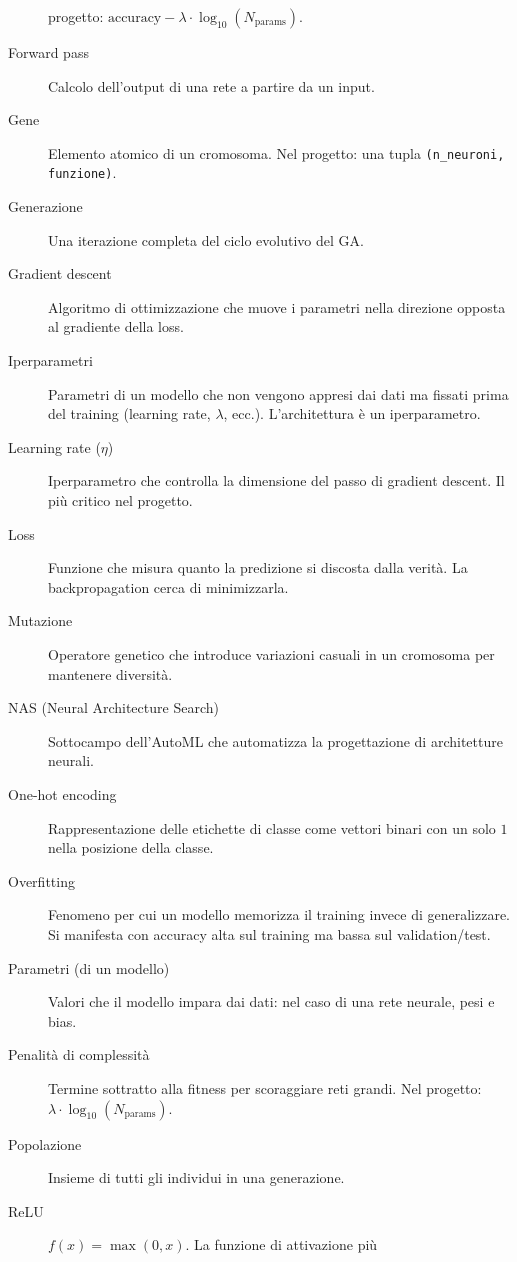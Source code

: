\documentclass[11pt,a4paper]{article}
\begin{document}
\begin{description}
        progetto: $\text{accuracy} - \lambda \cdot \log_{10}(N_{\text{params}})$.
    \item[Forward pass] Calcolo dell'output di una rete a partire da un
        input.
    \item[Gene] Elemento atomico di un cromosoma. Nel progetto: una
        tupla \texttt{(n\_neuroni, funzione)}.
    \item[Generazione] Una iterazione completa del ciclo evolutivo del GA.
    \item[Gradient descent] Algoritmo di ottimizzazione che muove i
        parametri nella direzione opposta al gradiente della loss.
    \item[Iperparametri] Parametri di un modello che non vengono appresi
        dai dati ma fissati prima del training (learning rate, $\lambda$,
        ecc.). L'architettura è un iperparametro.
    \item[Learning rate ($\eta$)] Iperparametro che controlla la
        dimensione del passo di gradient descent. Il più critico nel
        progetto.
    \item[Loss] Funzione che misura quanto la predizione si discosta
        dalla verità. La backpropagation cerca di minimizzarla.
    \item[Mutazione] Operatore genetico che introduce variazioni casuali
        in un cromosoma per mantenere diversità.
    \item[NAS (Neural Architecture Search)] Sottocampo dell'AutoML che
        automatizza la progettazione di architetture neurali.
    \item[One-hot encoding] Rappresentazione delle etichette di classe
        come vettori binari con un solo $1$ nella posizione della classe.
    \item[Overfitting] Fenomeno per cui un modello memorizza il training
        invece di generalizzare. Si manifesta con accuracy alta sul
        training ma bassa sul validation/test.
    \item[Parametri (di un modello)] Valori che il modello impara dai
        dati: nel caso di una rete neurale, pesi e bias.
    \item[Penalità di complessità] Termine sottratto alla fitness per
        scoraggiare reti grandi. Nel progetto: $\lambda \cdot
        \log_{10}(N_{\text{params}})$.
    \item[Popolazione] Insieme di tutti gli individui in una generazione.
    \item[ReLU] $f(x) = \max(0, x)$. La funzione di attivazione più

\end{description}
\end{document}
